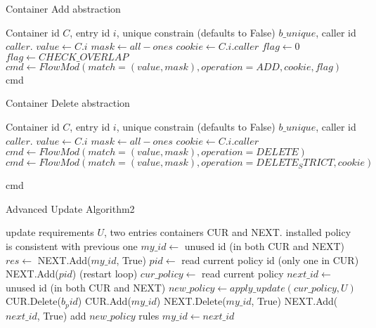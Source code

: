 \documentclass[conference]{sigcomm-alternate}
\begin{document}
\begin{algorithm}[t]
    \caption{Container Add abstraction}
    \label{alg:template}
    \begin{algorithmic}[1]
    \Require Container id $C$, entry id $i$, unique constrain (defaults to False) $b\_unique$, caller id $caller$.
    		\State $value \gets C.i$
    		\State $mask \gets all-ones$
    		\State $cookie \gets C.i.caller$
    			\State $flag \gets 0$
    		\Else
    		    \State $flag \gets CHECK\_OVERLAP$
    		\EndIf
    					\State $cmd\gets FlowMod(match=(value,mask), operation = ADD, cookie, flag) $
			\Return cmd
    \end{algorithmic}
\end{algorithm}

\begin{algorithm}[t]
    \caption{Container Delete abstraction}
    \label{alg:template}
    \begin{algorithmic}[1]
    \Require Container id $C$, entry id $i$, unique constrain (defaults to False) $b\_unique$, caller id $caller$.
    		\State $value \gets C.i$
    		\State $mask \gets all-ones$
    		\State $cookie \gets C.i.caller$
    			\State $cmd\gets FlowMod(match=(value,mask), operation=DELETE) $
    		\Else
    		    \State $cmd\gets FlowMod(match=(value,mask), operation=DELETE_STRICT, cookie) $
    		\EndIf
			
			\Return cmd
    \end{algorithmic}
\end{algorithm}

\begin{algorithm}[t]
    \caption{Advanced Update Algorithm2}
    \label{alg:template}
    \begin{algorithmic}[1]
    \Require update requirements $U$, two entries containers CUR and NEXT.
    \Ensure installed policy is consistent with previous one
		\Repeat
			\State $my\_id\gets$ unused id (in both CUR and NEXT)
    		\State $res \gets $ NEXT.Add($my\_id$, True)
    \EndIf
 		\Repeat
 			\State $pid\gets$ read current policy id (only one in CUR)
 			\State NEXT.Add($pid$)
 				 (restart loop)
 			\EndIf
 			\State $cur\_policy\gets$ read current policy
 			\State $next\_id\gets$  unused id (in both CUR and NEXT)
 			\State $new\_policy\gets apply\_update(cur\_policy,U)$
 			\startTransaction
	 			\State CUR.Delete($b_pid$)
	 			\State CUR.Add($my\_id$)
				\State NEXT.Delete($my\_id$, True)
				\State NEXT.Add($next\_id$, True)
	 			\State add $new\_policy$ rules %
 			\endTransaction
     	\State $my\_id\gets next\_id$

			\Return
    \end{algorithmic}
\end{algorithm}
\end{document}
